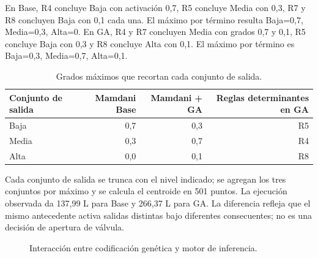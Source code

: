 \documentclass[11pt,letterpaper]{article}
\begin{document}
En Base, R4 concluye Baja con activación 0,7, R5 concluye Media con 0,3, R7 y R8 concluyen Baja con 0,1 cada una. El máximo por término resulta Baja=0,7, Media=0,3, Alta=0. En GA, R4 y R7 concluyen Media con grados 0,7 y 0,1, R5 concluye Baja con 0,3 y R8 concluye Alta con 0,1. El máximo por término es Baja=0,3, Media=0,7, Alta=0,1.

\begin{table}[H]
\centering
\caption{Grados máximos que recortan cada conjunto de salida.}\label{tab:consulta-recortes}
\begin{tabular}{lrrr}
\toprule
Conjunto de salida & Mamdani Base & Mamdani + GA & Reglas determinantes en GA\\
\midrule
Baja & 0,7 & 0,3 & R5\\
Media & 0,3 & 0,7 & R4\\
Alta & 0,0 & 0,1 & R8\\
\bottomrule
\end{tabular}
\end{table}

Cada conjunto de salida se trunca con el nivel indicado; se agregan los tres conjuntos por máximo y se calcula el centroide en 501 puntos. La ejecución observada da 137,99 L para Base y 266,37 L para GA. La diferencia refleja que el mismo antecedente activa salidas distintas bajo diferentes consecuentes; no es una decisión de apertura de válvula.

\begin{figure}[H]
\centering
{}
\caption{Interacción entre codificación genética y motor de inferencia.}\label{fig:ga-mamdani}
\end{figure}
\end{document}
